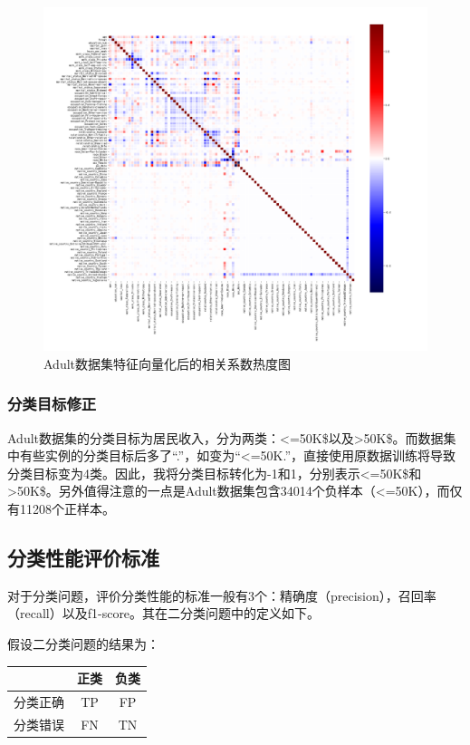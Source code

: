 \documentclass[12pt,a4paper]{article}
\theoremstyle{definition}
\begin{document}
\begin{figure}[H]
	\centering
	\includegraphics[width=0.85\linewidth]{img/cof_heat2.png}
	\caption{Adult数据集特征向量化后的相关系数热度图}
	\label{fig:heat3}
\end{figure}

\subsubsection{分类目标修正}
\label{sec:fix-target}

Adult数据集的分类目标为居民收入，分为两类：<=50K\$以及>50K\$。而数据集中有些实例的分类目标后多了“.”，如变为“<=50K.”，直接使用原数据训练将导致分类目标变为4类。因此，我将分类目标转化为-1和1，分别表示<=50K\$和>50K\$。另外值得注意的一点是Adult数据集包含34014个负样本（<=50K），而仅有11208个正样本。

\subsection{分类性能评价标准}

对于分类问题，评价分类性能的标准一般有3个：精确度（precision），召回率（recall）以及f1-score。其在二分类问题中的定义如下。

假设二分类问题的结果为：


\begin{table}[H]
	\centering
	\begin{tabular}{c|c|c}
		& 正类 &  负类 \\
		\hline
		\hline
	
		 分类正确 & TP & FP \\
		 分类错误 & FN & TN \\
	\end{tabular}
\end{table}
\end{document}
